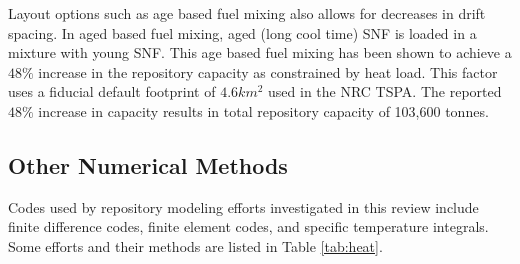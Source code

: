 
Layout options such as age based fuel mixing also allows for decreases in drift 
spacing. In aged based fuel mixing, aged (long cool time) SNF is loaded in a 
mixture with young SNF. This age based fuel mixing has been shown to achieve a 
$48\%$ increase in the repository capacity as constrained by heat
load\cite{nicholson_thermal_2007}. This factor uses a fiducial default
footprint of $4.6 km^2$ used in the NRC TSPA.  The reported $48\%$ increase in
capacity results in total repository capacity of 103,600
tonnes\cite{williams_total_2001}.


\subsection{Other Numerical Methods}

Codes used by repository modeling efforts investigated in this review include 
finite difference codes, finite element codes, and specific temperature 
integrals.  Some efforts and their methods are listed in Table \ref{tab:heat}.








